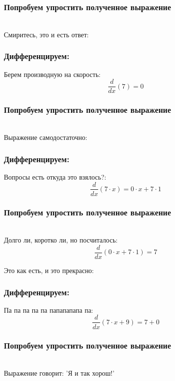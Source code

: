 \documentclass[a4paper,12pt]{article}
\begin{document}
\subsubsection*{Попробуем упростить полученное выражение}
\\Смиритесь, это и есть ответ:

\subsubsection*{Дифференцируем:}

Берем производную на скорость:
\begin{dmath}\frac{d}{dx}\left(7\right)=0\end{dmath}
\subsubsection*{Попробуем упростить полученное выражение}
\\Выражение самодостаточно:

\subsubsection*{Дифференцируем:}

Вопросы есть откуда это взялось?:
\begin{dmath}\frac{d}{dx}\left(7\cdot x\right)=0\cdot x+ 7\cdot 1\end{dmath}
\subsubsection*{Попробуем упростить полученное выражение}
\\Долго ли, коротко ли, но посчиталось:\\
\begin{dmath}
	\frac{d}{dx}\left(0\cdot x+ 7\cdot 1\right) = 7\end{dmath}

Это как есть, и это прекрасно:

\subsubsection*{Дифференцируем:}

Па па па па па папапапапа па:
\begin{dmath}\frac{d}{dx}\left(7\cdot x+ 9\right)=7+ 0\end{dmath}
\subsubsection*{Попробуем упростить полученное выражение}
\\Выражение говорит: 'Я и так хорош!'
\end{document}
